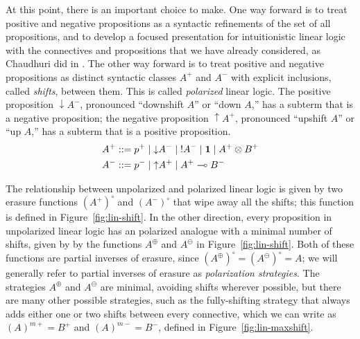 At this point, there is an important choice to make. One way forward
is to treat positive and negative propositions as a syntactic
refinements of the set of all propositions, and to develop a focused
presentation for intuitionistic linear logic with the connectives and
propositions that we have already considered, as Chaudhuri did in
\cite{chaudhuri06focused}.  The other way forward is to treat positive
and negative propositions as distinct syntactic classes $A^+$ and
$A^-$ with explicit inclusions, called {\it shifts}, between them.
This is called {\it polarized} linear logic.  The positive proposition
${\downarrow}A^-$, pronounced ``downshift $A$'' or ``down $A$,'' has a
subterm that is a negative proposition; the negative proposition
${\uparrow}A^+$, pronounced ``upshift $A$'' or ``up $A$,'' has a
subterm that is a positive proposition.
\begin{align*}
A^+ & ::= p^+ \mid {\downarrow}A^- \mid {!}A^- \mid \mathbf{1} \mid A^+ \otimes B^+\\
A^- & ::= p^- \mid {\uparrow}A^+ \mid A^+ \multimap B^-
\end{align*}



The relationship between unpolarized and polarized linear logic is
given by two erasure functions $(A^+)^\circ$ and $(A^-)^\circ$ that
wipe away all the shifts; this function is defined in
Figure~\ref{fig:lin-shift}. In the other direction, every proposition
in unpolarized linear logic has an polarized analogue with a minimal
number of shifts, given by by the functions $A^\oplus$ and $A^\ominus$
in Figure~\ref{fig:lin-shift}.  Both of these functions are partial
inverses of erasure, since $(A^\oplus)^\circ = (A^\ominus)^\circ = A$;
we will generally refer to partial inverses of erasure as {\it
  polarization strategies}. The strategies $A^\oplus$ and $A^\ominus$
are minimal, avoiding shifts wherever possible, but there are many
other possible strategies, such as the fully-shifting strategy that
always adds either one or two shifts between every connective, which
we can write as $(A)^{m+} = B^+$ and $(A)^{m-} = B^-$, defined in
Figure~\ref{fig:lin-maxshift}.

